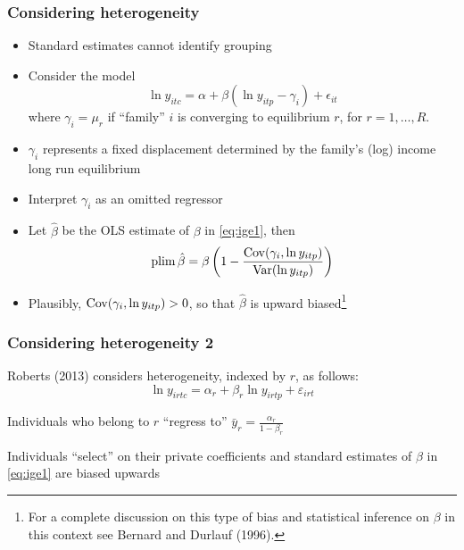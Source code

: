 \begin{frame}
	\frametitle{Considering heterogeneity}
		\begin{itemize}
			\item Standard estimates cannot identify grouping
			\item Consider the model
				\begin{equation}
				\ln y_{itc} = \alpha + \beta ( \ln y_{itp} - \gamma_{i}) + \epsilon_{it}				
				\end{equation}
where $\gamma_{i} = \mu_{r}$ if ``family'' $i$ is converging to equilibrium $r$, for $r = 1, \ldots, R$.
			\item $\gamma_{i}$ represents a fixed displacement determined by the family's (log) income long run equilibrium
			\item Interpret $\gamma_{i}$	as an omitted regressor
			\item Let $\hat{\beta}$ be the OLS estimate of $\beta$ in \eqref{eq:ige1}, then
			\begin{equation}
				\operatorname{plim} \hat{\beta} = \beta \left( 1 - \frac{\operatorname{Cov}(\gamma_{i}, \ln y_{itp} ) }{ \operatorname{Var} (\ln y_{itp})} \right)
			\end{equation}						
			\item Plausibly, $\operatorname{Cov}(\gamma_{i}, \ln y_{itp} ) >0$, so that $\hat{\beta}$ is upward biased\footnote{For a complete discussion on this type of bias and statistical inference on $\beta$ in this context see Bernard and Durlauf (1996).}
		\end{itemize}
\end{frame}

\begin{frame}
	\frametitle{Considering heterogeneity 2}
	\begin{wideitemize}
	\item Roberts (2013) considers heterogeneity, indexed by $r$, as follows:
	\begin{equation}
		\ln y_{irtc} = \alpha_{r} + \beta_{r} \ln y_{irtp} + \varepsilon_{irt} \label{eq:ige2}
	\end{equation}		
	\item Individuals who belong to $r$ ``regress to'' $\bar{y}_{r} = \frac{\alpha_{r}}{1 - \beta_{r}}$
	\item Individuals ``select'' on their private coefficients and standard estimates of $\beta$ in \eqref{eq:ige1} are biased upwards
	\end{wideitemize}
\end{frame}

